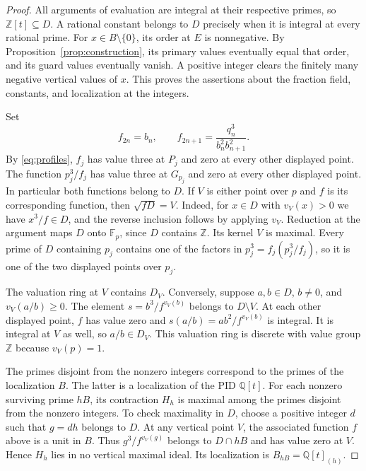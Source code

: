 \begin{proof}
    All arguments of evaluation are integral at their respective primes, so $\mathbb{Z}[t] \subseteq D$.
    A rational constant belongs to $D$ precisely when it is integral at every rational prime.
    For $x \in B \setminus \{0\}$, its order at $E$ is nonnegative.
    By Proposition~\ref{prop:construction}, its primary values eventually equal that order, and its guard values eventually vanish.
    A positive integer clears the finitely many negative vertical values of $x$.
    This proves the assertions about the fraction field, constants, and localization at the integers.

    Set
    \[
        f_{2n} = b_n,
        \qquad
        f_{2n + 1} = \frac{q_n^3}{b_n^2 b_{n + 1}^2}.
    \]
    By \eqref{eq:profiles}, $f_j$ has value three at $P_j$ and zero at every other displayed point.
    The function $p_j^3/f_j$ has value three at $G_{p_j}$ and zero at every other displayed point.
    In particular both functions belong to $D$.
    If $V$ is either point over $p$ and $f$ is its corresponding function, then $\sqrt{fD} = V$.
    Indeed, for $x \in D$ with $v_V(x) > 0$ we have $x^3/f \in D$, and the reverse inclusion follows by applying $v_V$.
    Reduction at the argument maps $D$ onto $\mathbb{F}_p$, since $D$ contains $\mathbb{Z}$.
    Its kernel $V$ is maximal.
    Every prime of $D$ containing $p_j$ contains one of the factors in $p_j^3 = f_j(p_j^3/f_j)$, so it is one of the two displayed points over $p_j$.

    The valuation ring at $V$ contains $D_V$.
    Conversely, suppose $a, b \in D$, $b \ne 0$, and $v_V(a/b) \ge 0$.
    The element $s = b^3/f^{v_V(b)}$ belongs to $D \setminus V$.
    At each other displayed point, $f$ has value zero and $s(a/b) = ab^2/f^{v_V(b)}$ is integral.
    It is integral at $V$ as well, so $a/b \in D_V$.
    This valuation ring is discrete with value group $\mathbb{Z}$ because $v_V(p) = 1$.

    The primes disjoint from the nonzero integers correspond to the primes of the localization $B$.
    The latter is a localization of the PID $\mathbb{Q}[t]$.
    For each nonzero surviving prime $hB$, its contraction $H_h$ is maximal among the primes disjoint from the nonzero integers.
    To check maximality in $D$, choose a positive integer $d$ such that $g = dh$ belongs to $D$.
    At any vertical point $V$, the associated function $f$ above is a unit in $B$.
    Thus $g^3/f^{v_V(g)}$ belongs to $D \cap hB$ and has value zero at $V$.
    Hence $H_h$ lies in no vertical maximal ideal.
    Its localization is $B_{hB} = \mathbb{Q}[t]_{(h)}$.
\end{proof}

